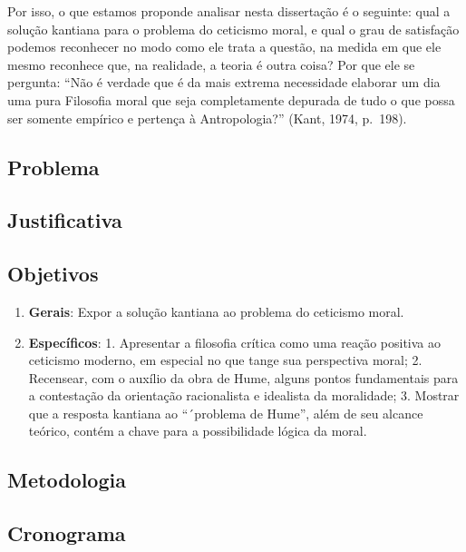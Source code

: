 \documentclass[
  paper=a4,
  twoside  ,captions=tableheading
]{scrbook}
\providecommand{\tightlist}{%
  \setlength{\itemsep}{0pt}\setlength{\parskip}{0pt}}
\begin{document}
Por isso, o que estamos proponde analisar nesta dissertação é o
seguinte: qual a solução kantiana para o problema do ceticismo moral, e
qual o grau de satisfação podemos reconhecer no modo como ele trata a
questão, na medida em que ele mesmo reconhece que, na realidade, a
teoria é outra coisa? Por que ele se pergunta: ``Não é verdade que é da
mais extrema necessidade elaborar um dia uma pura Filosofia moral que
seja completamente depurada de tudo o que possa ser somente empírico e
pertença à Antropologia?'' (Kant, 1974, p.~198).

\subsection{Problema}\label{problema}

\subsection{Justificativa}\label{justificativa}

\subsection{Objetivos}\label{objetivos}

\begin{enumerate}
\def\labelenumi{\arabic{enumi}.}
\tightlist
\item
  \textbf{Gerais}: Expor a solução kantiana ao problema do ceticismo
  moral.
\item
  \textbf{Específicos}: 1. Apresentar a filosofia crítica como uma
  reação positiva ao ceticismo moderno, em especial no que tange sua
  perspectiva moral; 2. Recensear, com o auxílio da obra de Hume, alguns
  pontos fundamentais para a contestação da orientação racionalista e
  idealista da moralidade; 3. Mostrar que a resposta kantiana ao
  ``´problema de Hume'', além de seu alcance teórico, contém a chave
  para a possibilidade lógica da moral.
\end{enumerate}

\subsection{Metodologia}\label{metodologia}

\subsection{Cronograma}\label{cronograma}
\end{document}
